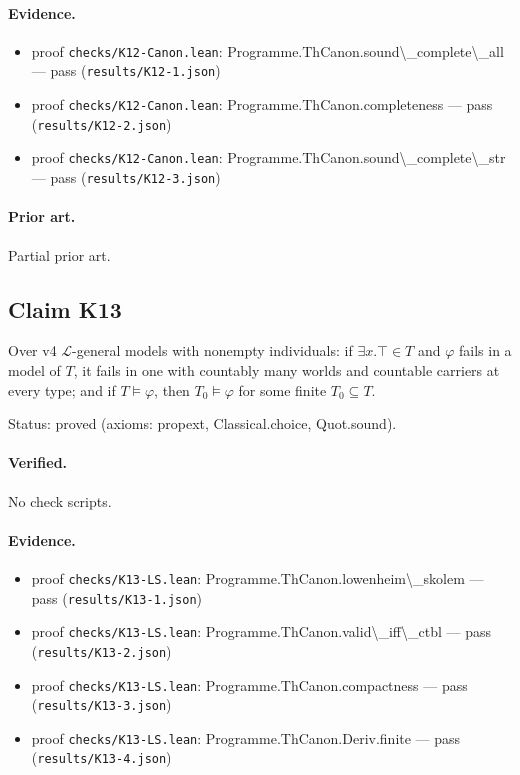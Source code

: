 \documentclass{article}
\begin{document}
\paragraph{Evidence.}
\begin{itemize}
\item proof \texttt{checks/K12-Canon.lean}: Programme.ThCanon.sound\textbackslash{}\_complete\textbackslash{}\_all --- pass (\texttt{results/K12-1.json})
\item proof \texttt{checks/K12-Canon.lean}: Programme.ThCanon.completeness --- pass (\texttt{results/K12-2.json})
\item proof \texttt{checks/K12-Canon.lean}: Programme.ThCanon.sound\textbackslash{}\_complete\textbackslash{}\_str --- pass (\texttt{results/K12-3.json})
\end{itemize}

\paragraph{Prior art.} Partial prior art.

\subsection*{Claim K13}

Over v4 $\mathcal L$-general models with nonempty individuals: if $\exists x.\top\in T$ and $\varphi$ fails in a model of $T$, it fails in one with countably many worlds and countable carriers at every type; and if $T\models\varphi$, then $T_0\models\varphi$ for some finite $T_0\subseteq T$.

Status: proved (axioms: propext, Classical.choice, Quot.sound).

\paragraph{Verified.}
No check scripts.

\paragraph{Evidence.}
\begin{itemize}
\item proof \texttt{checks/K13-LS.lean}: Programme.ThCanon.lowenheim\textbackslash{}\_skolem --- pass (\texttt{results/K13-1.json})
\item proof \texttt{checks/K13-LS.lean}: Programme.ThCanon.valid\textbackslash{}\_iff\textbackslash{}\_ctbl --- pass (\texttt{results/K13-2.json})
\item proof \texttt{checks/K13-LS.lean}: Programme.ThCanon.compactness --- pass (\texttt{results/K13-3.json})
\item proof \texttt{checks/K13-LS.lean}: Programme.ThCanon.Deriv.finite --- pass (\texttt{results/K13-4.json})
\end{itemize}
\end{document}
